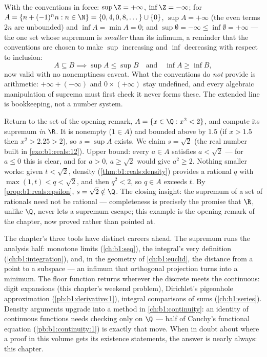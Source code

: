 \begin{example}\label{ex:b1:reals:extendedcompute}
With the conventions in force: $\sup \Z = +\infty$, $\inf \Z =
-\infty$; for $A = \{n + (-1)^n n : n \in \N\} = \{0, 4, 0, 8,
\dots\} \cup \{0\}$, $\sup A = +\infty$ (the even terms $2n$ are
unbounded) and $\inf A = \min A = 0$; and $\sup\emptyset =
-\infty \leq \inf\emptyset = +\infty$ --- the one set whose
supremum is \emph{smaller} than its infimum, a reminder that the
conventions are chosen to make $\sup$ increasing and $\inf$
decreasing with respect to inclusion:
\[
A \subseteq B \implies \sup A \leq \sup B
\quad\text{and}\quad \inf A \geq \inf B ,
\]
now valid with no nonemptiness caveat. What the conventions do
\emph{not} provide is arithmetic: $+\infty + (-\infty)$ and $0
\times (+\infty)$ stay undefined, and every algebraic
manipulation of suprema must first check it never forms these.
The extended line is bookkeeping, not a number system.
\end{example}

\begin{example}\label{ex:b1:reals:supescape}
Return to the set of the opening remark, $A = \{x \in \Q : x^2 <
2\}$, and compute its supremum \emph{in $\R$}. It is nonempty
($1 \in A$) and bounded above by $1.5$ (if $x > 1.5$ then $x^2 >
2.25 > 2$), so $s = \sup A$ exists. We claim $s = \sqrt 2$ (the
real number built in \cref{exo:b1:reals:12}). Upper bound: every
$a \in A$ satisfies $a < \sqrt2$ --- for $a \leq 0$ this is
clear, and for $a > 0$, $a \geq \sqrt2$ would give $a^2 \geq 2$.
Nothing smaller works: given $t < \sqrt2$, density
(\cref{thm:b1:reals:density}) provides a rational $q$ with
$\max(1, t) < q < \sqrt 2$, and then $q^2 < 2$, so $q \in A$
exceeds $t$. By \cref{prop:b1:reals:epsilon}, $s = \sqrt2
\notin \Q$. The closing insight: the supremum of a set of
rationals need not be rational --- completeness is precisely the
promise that $\R$, unlike $\Q$, never lets a supremum escape;
this example is the opening remark of the chapter, now proved
rather than pointed at.
\end{example}

\begin{remark}
The chapter's three tools have distinct careers ahead. The
supremum runs the analysis half: monotone limits
(\cref{ch:b1:seq}), the integral's very definition
(\cref{ch:b1:integration}), and, in the geometry of
\cref{ch:b1:euclid}, the distance from a point to a subspace ---
an infimum that orthogonal projection turns into a minimum. The
floor function returns wherever the discrete meets the
continuous: digit expansions (this chapter's weekend problem),
Dirichlet's pigeonhole approximation
(\cref{pb:b1:derivative:1}), integral comparisons of sums
(\cref{ch:b1:series}). Density arguments upgrade into a method
in \cref{ch:b1:continuity}: an identity of continuous functions
needs checking only on $\Q$ --- half of Cauchy's functional
equation (\cref{pb:b1:continuity:1}) is exactly that move. When
in doubt about where a proof in this volume gets its existence
statements, the answer is nearly always: this chapter.
\end{remark}

